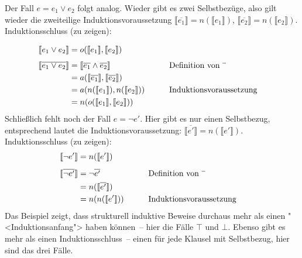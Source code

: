 Der Fall $e=e_1\vee e_2$ folgt analog.  Wieder gibt es zwei
Selbstbezüge, also gilt wieder die zweiteilige Induktionsvoraussetzung
$\llbracket \overline{e_1} \rrbracket = n(\llbracket e_1\rrbracket)$,
$\llbracket \overline{e_2} \rrbracket = n(\llbracket e_2\rrbracket)$.
Induktionsschluss (zu zeigen):

\begin{alignat*}{3}
  \llbracket e_1 \vee e_2 \rrbracket &= o(\llbracket
  e_1\rrbracket, \llbracket e_2\rrbracket)
  \\[1ex]
  \llbracket \overline{e_1 \vee e_2} \rrbracket &= \llbracket
  \overline{e_1} \wedge \overline{e_2} \rrbracket
  && \qquad \text{Definition von $\overline{\raisebox{1ex}{\hspace{1ex}}}$}
  \\
  &= 
  a(\llbracket \overline{e_1} \rrbracket,  \llbracket \overline{e_2}
  \rrbracket)
  \\
  &= a(n(\llbracket e_1\rrbracket), n(\llbracket e_2\rrbracket))
  && \qquad \text{Induktionsvoraussetzung}
  \\
  &= n(o(\llbracket e_1\rrbracket, \llbracket e_2\rrbracket))
\end{alignat*}
%
Schließlich fehlt noch der Fall $e = \neg e'$.  Hier gibt es nur
einen Selbstbezug, entsprechend lautet die Induktionsvoraussetzung:
$\llbracket \overline{e'} \rrbracket = n(\llbracket e'\rrbracket)$.
Induktionsschluss (zu zeigen):
%
\begin{alignat*}{3}
  \llbracket \neg e' \rrbracket &= n(\llbracket e'\rrbracket)
  \\[1ex]
  \llbracket \overline{\neg e'} \rrbracket
  & =
  \neg \overline{e'}
  && \qquad \text{Definition von $\overline{\raisebox{1ex}{\hspace{1ex}}}$}
  \\
  &=
  n(\llbracket \overline{e'}\rrbracket)
  \\
  &= n(n(\llbracket e' \rrbracket))
  && \qquad \text{Induktionsvoraussetzung}
\end{alignat*}
%
Das Beispiel zeigt, dass strukturell induktive Beweise durchaus mehr
als einen "<Induktionsanfang"> haben können~-- hier die Fälle $\top$
und $\bot$.  Ebenso gibt es mehr als einen Induktionsschluss~-- einen
für jede Klausel mit Selbstbezug, hier sind das drei Fälle.

